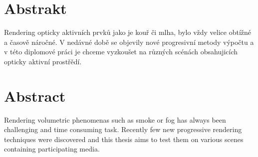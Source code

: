 \section*{Abstrakt}\label{abstract}
\indent\indent 
Rendering opticky aktivních prvků jako je kouř či mlha, bylo vždy velice obtížné a časově náročné. V nedávné době se objevily nové progresivní metody výpočtu a v této diplomové práci je chceme vyzkoušet na různých scénách obsahujicích opticky aktivní prostřědí.

\newpage
\section*{Abstract}
\indent\indent 
Rendering volumetric phenomenas such as smoke or fog has always been challenging and time consuming task. Recently few new progressive rendering techniques were discovered and this thesis aims to test them on various scenes containing participating media. 